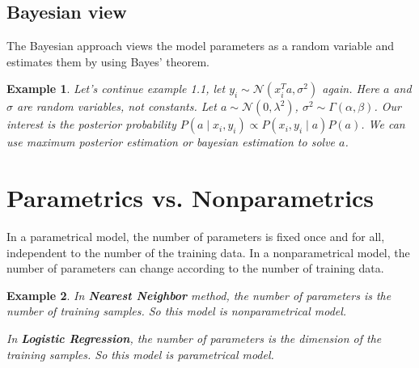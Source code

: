 \documentclass[11pt]{article}
\def\MN{{\mathcal N}}
\newtheorem{example}{Example}[section]
\begin{document}
\subsection{Bayesian view}
The Bayesian approach views the model parameters as a random variable and  estimates them by using Bayes' theorem.

\begin{example}
Let's continue example 1.1, let $y_i \sim \MN(x_i^T a, \sigma^2)$ again. Here $a$ and $\sigma$ are random variables, not constants. Let $a \sim \MN(0, \lambda^2)$, $\sigma^2 \sim \Gamma(\alpha, \beta)$.
Our interest is the posterior probability $P(a\mid x_i, y_i) \propto P(x_i, y_i\mid a)P(a)$. We can use maximum posterior estimation or bayesian estimation to solve $a$.
\end{example}


\section{Parametrics vs. Nonparametrics}
In a parametrical model, the number of parameters is fixed once and for all, independent to the number of the training data.
In a nonparametrical model, the number of parameters can change according to the number of training data.

\begin{example}
In \textbf{Nearest Neighbor} method, the number of parameters is the number of training samples. So this model is nonparametrical model.

In \textbf{Logistic Regression}, the number of parameters is the dimension of the training samples. So this model is parametrical model.
\end{example}
\end{document}
